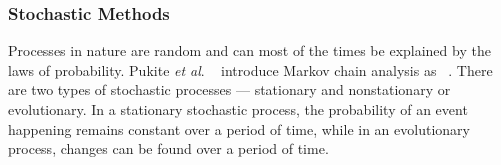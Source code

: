 \subsubsection{Stochastic Methods}\label{sec:stochastic_process}
Processes in nature are random and can most of the times be explained by the laws of probability. Pukite \textit{et al}. ~\cite{5312000} introduce Markov chain analysis as \textit{~\cite{5312000}}. There are two types of stochastic processes --- stationary and nonstationary or evolutionary. In a stationary stochastic process, the probability of an event happening remains constant over a period of time, while in an evolutionary process, changes can be found over a period of time.\\
